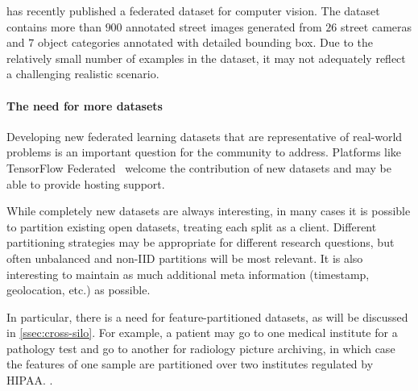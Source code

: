 \documentclass[11pt]{article}
\begin{document}

\citet{luo2019real} has recently published a federated dataset for computer vision. The dataset contains more than $900$ annotated street images generated from $26$ street cameras and $7$ object categories annotated with detailed bounding box. Due to the relatively small number of examples in the dataset, it may not adequately reflect a challenging realistic scenario.

\paragraph{The need for more datasets}
Developing new federated learning datasets that are representative of real-world problems is an important question for the community to address. Platforms like TensorFlow Federated~\citep{tff} welcome the contribution of new datasets and may be able to provide hosting support.

While completely new datasets are always interesting, in many cases it is possible to partition existing open datasets, treating each split as a client. Different partitioning strategies may be appropriate for different research questions, but often unbalanced and non-IID partitions will be most relevant. It is also interesting to maintain as much additional meta information (timestamp, geolocation, etc.) as possible.

In particular, there is a need for feature-partitioned datasets, as will be discussed in \cref{ssec:cross-silo}. For example, a patient may go to one medical institute for a pathology test and go to another for radiology picture archiving, in which case the features of one sample are partitioned over two institutes regulated by HIPAA. \citep{annas2003hipaa}.
\end{document}

